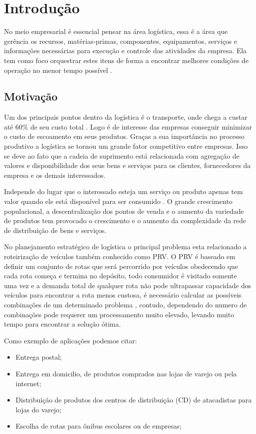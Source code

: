 \chapter[Introdução]{Introdução}

No meio empresarial é essencial pensar na área logística, essa é a área que gerência os recursos, matérias-primas, componentes, equipamentos, serviços e informações necessárias para execução e controle das atividades da empresa. 
Ela tem como foco orquestrar estes itens de forma a encontrar melhores condições de operação no menor tempo possível \cite{DIAS}.

\section{Motivação}

Um dos principais pontos dentro da logística é o transporte, onde chega a custar até 60\% de seu custo total \cite{RODRIGUES}.
Logo é de interesse das empresas conseguir minimizar o custo de escoamento em seus produtos.
Graças a sua importância no processo produtivo a logística se tornou um grande fator competitivo entre empresas.
Isso se deve ao fato que a cadeia de suprimento está relacionada com agregação de valores e disponibilidade dos seus bens e serviços para os clientes, fornecedores da empresa e os demais interessados. 

Independe do lugar que o interessado esteja um serviço ou produto apenas tem valor quando ele está disponível para ser consumido \cite{TSUDA}.
O grande crescimento populacional, a descentralização dos pontos de venda e o aumento da variedade de produtos tem provocado o crescimento e o aumento da complexidade da rede de distribuição de bens e serviços.

No planejamento estratégico de logística o principal problema esta relacionado a roteirização de veículos \cite{TSUDA} também conhecido como PRV. 
O PRV é baseado em definir um conjunto de rotas que será percorrido por veículos obedecendo que cada rota começa e termina no depósito, todo consumidor é visitado somente uma vez e a demanda total de qualquer rota não pode ultrapassar capacidade dos veículos para encontrar a rota menos custosa, é necessário calcular as possíveis combinações de um determinado problema , contudo, dependendo do numero de combinações pode requerer um processamento muito elevado, levando muito tempo para encontrar a solução ótima.

Como exemplo de aplicações podemos citar:
\begin{itemize}
	\item Entrega postal;
	\item Entrega em domicilio, de produtos comprados nas lojas de varejo ou pela internet;
	\item Distribuição de produtos dos centros de distribuição (CD) de atacadistas para lojas do varejo;
	\item Escolha de rotas para ônibus escolares ou de empresas;
\end{itemize}

